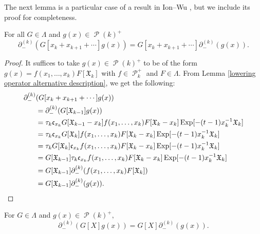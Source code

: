 \documentclass[ALCO,Unicode]{cedram}
\DeclareMathOperator{\sP}{\mathscr{P} }
\DeclareMathOperator{\EXP}{\mathrm{Exp}}
\begin{document}
The next lemma is a particular case of a result in Ion--Wu \cite[Section 7, (7.8), page 35]{Ion_2022}, but we include its proof for completeness.

\begin{lemm}\label{lowering is a partial sym module map}
For all $G \in \Lambda$ and $g(x) \in \sP(k)^{+}$ 
$$ \partial_{-}^{(k)}(G[x_k + x_{k+1}+ \cdots]g(x)) = G[x_k + x_{k+1}+ \cdots] \partial_{-}^{(k)}(g(x)).$$
\end{lemm}

\begin{proof}
It suffices to take $g(x) \in \sP(k)^{+}$ to be of the form $g(x) = f(x_1,\ldots,x_k)F[\mathfrak{X}_{k}]$ with $f\in \sP_{k}^{+}$ and $F \in \Lambda$.
From Lemma \ref{lowering operator alternative description}, we get the following:
\begin{align*}
\partial_{-}^{(k)}&(G[x_k + x_{k+1}+ \cdots]g(x)) \\ 
&= \partial_{-}^{(k)}(G[\mathfrak{X}_{k-1}]g(x)) \\
&= \tau_k \mathfrak{c}_{x_k} G[\mathfrak{X}_{k-1}-x_k] f(x_1,\ldots,x_k)F[\mathfrak{X}_{k} - x_k]\EXP[-(t-1)x_k^{-1}\mathfrak{X}_{k}] \\
&= \tau_k \mathfrak{c}_{x_k} G[\mathfrak{X}_{k}] f(x_1,\ldots,x_k)F[\mathfrak{X}_{k} - x_k]\EXP[-(t-1)x_k^{-1}\mathfrak{X}_{k}] \\
&= \tau_kG[\mathfrak{X}_{k}]\mathfrak{c}_{x_k}f(x_1,\ldots,x_k)F[\mathfrak{X}_{k} - x_k]\EXP[-(t-1)x_k^{-1}\mathfrak{X}_{k}]\\
&= G[\mathfrak{X}_{k-1}]\tau_k\mathfrak{c}_{x_k}f(x_1,\ldots,x_k)F[\mathfrak{X}_{k} - x_k]\EXP[-(t-1)x_k^{-1}\mathfrak{X}_{k}]\\
&= G[\mathfrak{X}_{k-1}]\partial_{-}^{(k)}(f(x_1,\ldots,x_k)F[\mathfrak{X}_{k}]) \\
&= G[\mathfrak{X}_{k-1}]\partial_{-}^{(k)}(g(x)). \qedhere
\end{align*}    
\end{proof}

\begin{coro}\label{lowering is a sym module map}
    For $G \in \Lambda$ and $g(x) \in \sP(k)^{+},$
    $$\partial_{-}^{(k)}(G[X]g(x)) = G[X] \partial_{-}^{(k)}(g(x)).$$
\end{coro}
\end{document}
